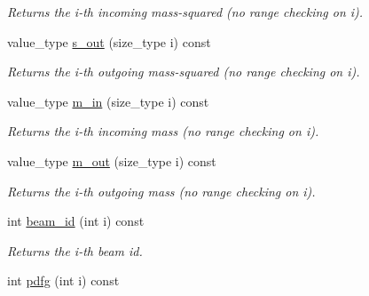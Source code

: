 \begin{DoxyCompactItemize}
\begin{DoxyCompactList}\small\item\em Returns the i-\/th incoming mass-\/squared (no range checking on i). \end{DoxyCompactList}\item 
\hypertarget{a00210_a856af7863609bb4d14dafe1ee7024ce0}{value\-\_\-type \hyperlink{a00210_a856af7863609bb4d14dafe1ee7024ce0}{s\-\_\-out} (size\-\_\-type i) const }\label{a00210_a856af7863609bb4d14dafe1ee7024ce0}

\begin{DoxyCompactList}\small\item\em Returns the i-\/th outgoing mass-\/squared (no range checking on i). \end{DoxyCompactList}\item 
\hypertarget{a00210_aa09103ecc4bbb6bd92ce3f7c383c21ee}{value\-\_\-type \hyperlink{a00210_aa09103ecc4bbb6bd92ce3f7c383c21ee}{m\-\_\-in} (size\-\_\-type i) const }\label{a00210_aa09103ecc4bbb6bd92ce3f7c383c21ee}

\begin{DoxyCompactList}\small\item\em Returns the i-\/th incoming mass (no range checking on i). \end{DoxyCompactList}\item 
\hypertarget{a00210_a840b7af8f27e9f671ef7661e23a10204}{value\-\_\-type \hyperlink{a00210_a840b7af8f27e9f671ef7661e23a10204}{m\-\_\-out} (size\-\_\-type i) const }\label{a00210_a840b7af8f27e9f671ef7661e23a10204}

\begin{DoxyCompactList}\small\item\em Returns the i-\/th outgoing mass (no range checking on i). \end{DoxyCompactList}\item 
\hypertarget{a00210_a69d39c68698b14c8fd5abfd162b8f8ef}{int \hyperlink{a00210_a69d39c68698b14c8fd5abfd162b8f8ef}{beam\-\_\-id} (int i) const }\label{a00210_a69d39c68698b14c8fd5abfd162b8f8ef}

\begin{DoxyCompactList}\small\item\em Returns the i-\/th beam id. \end{DoxyCompactList}\item 
\hypertarget{a00210_ac24c26a9e3c14c3b650f077a595c571b}{int \hyperlink{a00210_ac24c26a9e3c14c3b650f077a595c571b}{pdfg} (int i) const }\label{a00210_ac24c26a9e3c14c3b650f077a595c571b}


\end{DoxyCompactItemize}
